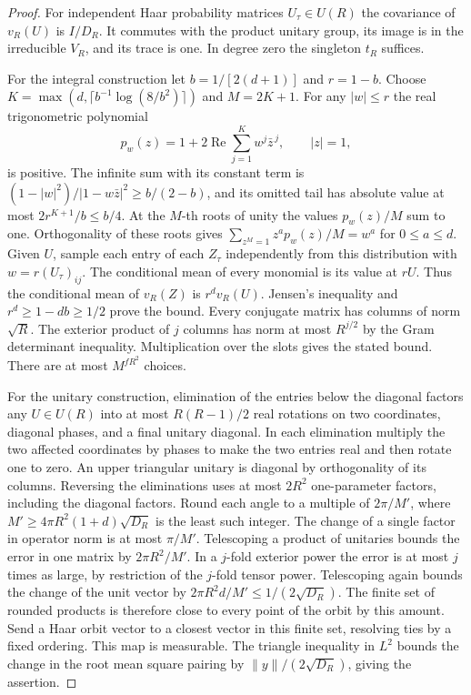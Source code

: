 \documentclass[a4paper,11pt]{article}
\theoremstyle{definition}
\theoremstyle{remark}
\newcommand{\real}{\operatorname{Re}}\newcommand{\imag}{\operatorname{Im}}
\numberwithin{equation}{section}
\begin{document}
\begin{proof}
For independent Haar probability matrices \(U_\tau\in U(R)\)
the covariance of \(v_R(U)\) is \(I/D_R\). It commutes with the
product unitary group, its image is in the irreducible \(V_R\),
and its trace is one. In degree zero the singleton \(t_R\) suffices.

For the integral construction let \(b=1/[2(d+1)]\) and
\(r=1-b\). Choose
\(K=\max(d,\lceil b^{-1}\log(8/b^2)\rceil)\) and \(M=2K+1\).
For any \(|w|\le r\) the real trigonometric polynomial
\[
        p_w(z)=1+2\real\sum_{j=1}^{K}w^j\bar z^{\,j},
                          \qquad |z|=1,
\]
is positive. The infinite sum with its constant term is
\((1-|w|^2)/|1-w\bar z|^2\ge b/(2-b)\), and its omitted tail
has absolute value at most \(2r^{K+1}/b\le b/4\).
At the \(M\)-th roots of unity the values \(p_w(z)/M\) sum to
one. Orthogonality of these roots gives
\(\sum_{z^M=1}z^a p_w(z)/M=w^a\) for \(0\le a\le d\).
Given \(U\), sample each entry of each \(Z_\tau\) independently
from this distribution with \(w=r(U_\tau)_{ij}\).
The conditional mean of every monomial is its value at \(rU\).
Thus the conditional mean of \(v_R(Z)\) is \(r^d v_R(U)\).
Jensen's inequality and \(r^d\ge1-db\ge1/2\) prove the bound.
Every conjugate matrix has columns of norm \(\sqrt R\).
The exterior product of \(j\) columns has norm at most
\(R^{j/2}\) by the Gram determinant inequality. Multiplication
over the slots gives the stated bound. There are at most
\(M^{fR^2}\) choices.

For the unitary construction, elimination of the entries below
the diagonal factors any \(U\in U(R)\) into at most
\(R(R-1)/2\) real rotations on two coordinates, diagonal phases,
and a final unitary diagonal. In each elimination multiply the
two affected coordinates by phases to make the two entries real
and then rotate one to zero. An upper triangular unitary is
diagonal by orthogonality of its columns. Reversing the
eliminations uses at most \(2R^2\) one-parameter factors,
including the diagonal factors. Round each angle to a multiple
of \(2\pi/M'\), where
\(M'\ge 4\pi R^2(1+d)\sqrt{D_R}\) is the least such integer.
The change of a single factor in operator norm is at most
\(\pi/M'\). Telescoping a product of unitaries bounds the error
in one matrix by \(2\pi R^2/M'\). In a \(j\)-fold exterior power
the error is at most \(j\) times as large, by restriction of
the \(j\)-fold tensor power. Telescoping again bounds the change
of the unit vector by \(2\pi R^2d/M'\le1/(2\sqrt{D_R})\).
The finite set of rounded products is therefore close to every
point of the orbit by this amount. Send a Haar orbit vector to
a closest vector in this finite set, resolving ties by a fixed
ordering. This map is measurable. The triangle inequality in
\(L^2\) bounds the change in the root mean square pairing by
\(\|y\|/(2\sqrt{D_R})\), giving the assertion.


\end{proof}
\end{document}
